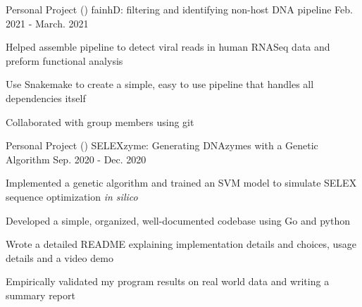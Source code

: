 \begin{cventries}
	\cventry
    {Personal Project ()}
        {fainhD: filtering and identifying non-host DNA pipeline}
      {Feb. 2021 - March. 2021}
      {}
      {
        \begin{cvitems}
        \item{Helped assemble pipeline to detect viral reads in human RNASeq data and preform functional analysis}
        \item{Use Snakemake to create a simple, easy to use pipeline that handles all dependencies itself}
        \item{Collaborated with group members using git}
        \end{cvitems}
      }
	\cventry
      {Personal Project ()}
      {SELEXzyme: Generating DNAzymes with a Genetic Algorithm}
      {Sep. 2020 - Dec. 2020}
      {}
      {
        \begin{cvitems}
          \item{Implemented a genetic algorithm and trained an SVM model to simulate SELEX sequence optimization \textit{in silico}}
          \item{Developed a simple, organized, well-documented codebase using Go and python}
          \item{Wrote a detailed README explaining implementation details and choices, usage details and a video demo}
          \item{Empirically validated my program results on real world data and writing a summary report}
        \end{cvitems}
      }

\end{cventries}

